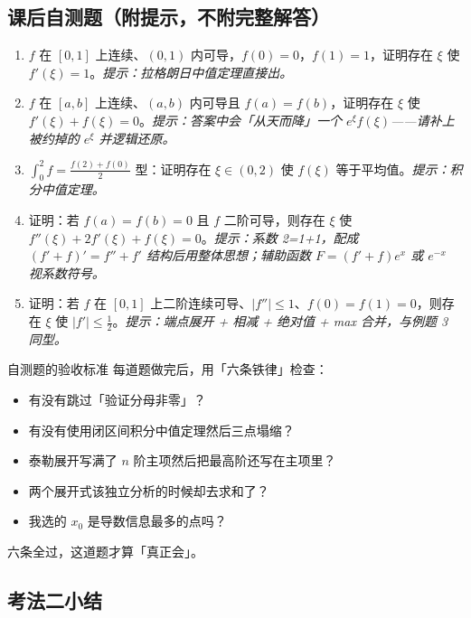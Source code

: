 \documentclass[a4paper]{article}
\begin{document}
\subsection{课后自测题（附提示，不附完整解答）}

\begin{enumerate}
\item $f$ 在 $[0,1]$ 上连续、$(0,1)$ 内可导，$f(0)=0$，$f(1)=1$，证明存在 $\xi$ 使 $f'(\xi)=1$。\emph{提示：拉格朗日中值定理直接出。}
\item $f$ 在 $[a,b]$ 上连续、$(a,b)$ 内可导且 $f(a)=f(b)$，证明存在 $\xi$ 使 $f'(\xi)+f(\xi)=0$。\emph{提示：答案中会「从天而降」一个 $e^{\xi}f(\xi)$——请补上被约掉的 $e^{\xi}$ 并逻辑还原。}
\item $\int_0^2 f=\frac{f(2)+f(0)}2$ 型：证明存在 $\xi\in(0,2)$ 使 $f(\xi)$ 等于平均值。\emph{提示：积分中值定理。}
\item 证明：若 $f(a)=f(b)=0$ 且 $f$ 二阶可导，则存在 $\xi$ 使 $f''(\xi)+2f'(\xi)+f(\xi)=0$。\emph{提示：系数 2=1+1，配成 $(f'+f)'=f''+f'$ 结构后用整体思想；辅助函数 $F=(f'+f)e^{x}$ 或 $e^{-x}$ 视系数符号。}
\item 证明：若 $f$ 在 $[0,1]$ 上二阶连续可导、$|f''|\le1$、$f(0)=f(1)=0$，则存在 $\xi$ 使 $|f'|\le\frac12$。\emph{提示：端点展开 + 相减 + 绝对值 + max 合并，与例题 3 同型。}
\end{enumerate}

\begin{importantbox}{自测题的验收标准}
每道题做完后，用「六条铁律」检查：
\begin{itemize}
\item 有没有跳过「验证分母非零」？
\item 有没有使用闭区间积分中值定理然后三点塌缩？
\item 泰勒展开写满了 $n$ 阶主项然后把最高阶还写在主项里？
\item 两个展开式该独立分析的时候却去求和了？
\item 我选的 $x_0$ 是导数信息最多的点吗？
\end{itemize}
六条全过，这道题才算「真正会」。
\end{importantbox}

\subsection{考法二小结}
\end{document}
